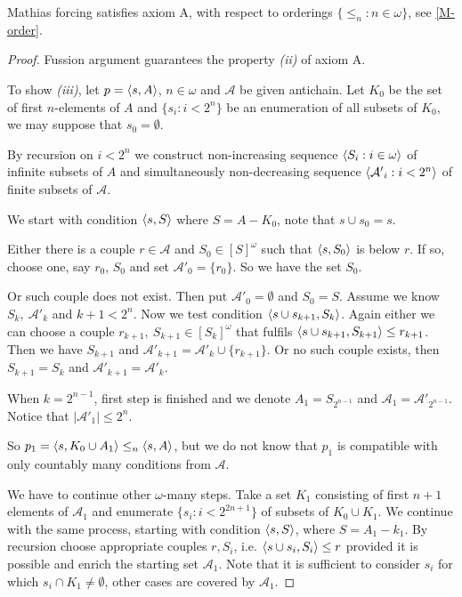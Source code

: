 \begin{proposition}
 Mathias forcing satisfies axiom A, with respect to orderings
 $\{\leq_n : n \in \omega \}$, see \ref{M-order}.
\end{proposition}

\begin{proof}
 Fussion argument guarantees the  property {\itshape (ii)} of axiom A.

\smallskip

To show {\itshape (iii)}, let $p = \langle s,A\rangle$, $n\in\omega$ and
$\mathcal A$ be given antichain. Let $K_0$ be the set of first $n$-elements
of $A$ and $\{ s_i : i < 2^n \}$ be an enumeration of all
subsets of $K_0$, we may suppose that $s_0 = \emptyset$.

By recursion on $i < 2^n$ we construct non-increasing sequence
$\langle S_i : i \in \omega\rangle$ of infinite subsets of $A$ and simultaneously
non-decreasing sequence $\langle{\mathcal A'}_i : i < 2^n \rangle$ of finite subsets
of $\mathcal A$.

We start with condition $\langle s,S\rangle$ where $S = A - K_0$, note that
$s \cup s_0 =s$.

Either there is a couple $r \in \mathcal A$ and $S_0 \in [S]^\omega$
such that $\langle s, S_0 \rangle$ is below $r$. If so, choose one, say $r_0$, $S_0$
and set ${\mathcal A'}_0 = \{r_0\}$. So we have the set $S_0$.

Or such couple does not exist. Then put ${\mathcal A'}_0 = \emptyset$
and $S_0 = S$. Assume we know $S_k,\ {\mathcal A'}_k$ and $k+1 < 2^n$.
Now we test condition $\langle s \cup s_{k+1}, S_k \rangle$. Again either
we can choose a couple $r_{k+1}, \ S_{k+1} \in [S_k]^\omega$
that fulfils $\langle s \cup s_{k+1}, S_{k+1}\rangle \leq r_{k+1}$. Then
we have $S_{k+1}$ and ${\mathcal A'}_{k+1} = {\mathcal A'}_k \cup \{r_{k+1}\}$.
Or no such couple exists, then $S_{k+1} = S_k$ and
${\mathcal A'}_{k+1} = {\mathcal A'}_k$.

When $k = 2^{n-1}$, first step is finished and we denote $A_1=S_{2^{n-1}}$
and ${\mathcal A}_1 = {\mathcal A'}_{2^{n-1}}$. Notice that
$|{\mathcal A'}_1| \leq 2^n$.

So $p_1 = \langle s , K_0 \cup A_1 \rangle \leq_n \langle s,A\rangle$, but we do not know that
$p_1$ is compatible with only countably many conditions from $\mathcal A$.

We have to continue  other $\omega$-many steps. Take a set $K_1$
consisting of first $n+1$ elements of ${\mathcal A}_1$ and enumerate
$\{s_i : i < 2^{2n+1} \}$ of subsets of $K_0 \cup K_1$. We continue
with the same process, starting with condition $\langle s,S\rangle$, where
$S = A_1 - k_1$. By recursion choose appropriate couples $r,S_i$,
i.e. $\langle s \cup s_i , S_i \rangle \leq r$ provided it is possible and
enrich the starting set $\mathcal A_1$. Note that it is sufficient
to consider $s_i$ for which $s_i \cap K_1 \not = \emptyset$,
other cases are covered by $\mathcal A_1$.


\end{proof}
